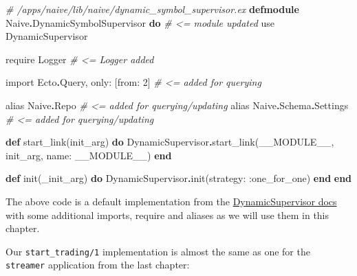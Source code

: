 \documentclass[
]{book}
\newenvironment{Shaded}{\begin{snugshade}}{\end{snugshade}}
\newcommand{\CommentTok}[1]{\textcolor[rgb]{0.56,0.35,0.01}{\textit{#1}}}
\newcommand{\ConstantTok}[1]{\textcolor[rgb]{0.00,0.00,0.00}{#1}}
\newcommand{\DecValTok}[1]{\textcolor[rgb]{0.00,0.00,0.81}{#1}}
\newcommand{\ImportTok}[1]{#1}
\newcommand{\KeywordTok}[1]{\textcolor[rgb]{0.13,0.29,0.53}{\textbf{#1}}}
\newcommand{\NormalTok}[1]{#1}
\newcommand{\OperatorTok}[1]{\textcolor[rgb]{0.81,0.36,0.00}{\textbf{#1}}}
\newcommand{\VariableTok}[1]{\textcolor[rgb]{0.00,0.00,0.00}{#1}}
\begin{document}
\begin{Shaded}
\begin{Highlighting}[]
\CommentTok{\# /apps/naive/lib/naive/dynamic\_symbol\_supervisor.ex}
\KeywordTok{defmodule} \ConstantTok{Naive}\OperatorTok{.}\ConstantTok{DynamicSymbolSupervisor} \KeywordTok{do} \CommentTok{\# \textless{}= module updated}
  \ImportTok{use} \ConstantTok{DynamicSupervisor}

  \ImportTok{require} \ConstantTok{Logger} \CommentTok{\# \textless{}= Logger added}

  \ImportTok{import} \ConstantTok{Ecto}\OperatorTok{.}\ConstantTok{Query}\NormalTok{, }\VariableTok{only:}\NormalTok{ [}\VariableTok{from:} \DecValTok{2}\NormalTok{] }\CommentTok{\# \textless{}= added for querying}

  \ImportTok{alias} \ConstantTok{Naive}\OperatorTok{.}\ConstantTok{Repo}             \CommentTok{\# \textless{}= added for querying/updating}
  \ImportTok{alias} \ConstantTok{Naive}\OperatorTok{.}\ConstantTok{Schema}\OperatorTok{.}\ConstantTok{Settings}  \CommentTok{\# \textless{}= added for querying/updating}

  \KeywordTok{def}\NormalTok{ start\_link(init\_arg) }\KeywordTok{do}
    \ConstantTok{DynamicSupervisor}\OperatorTok{.}\NormalTok{start\_link(}\ConstantTok{\_\_MODULE\_\_}\NormalTok{, init\_arg, }\VariableTok{name:} \ConstantTok{\_\_MODULE\_\_}\NormalTok{)}
  \KeywordTok{end}

  \KeywordTok{def}\NormalTok{ init(\_init\_arg) }\KeywordTok{do}
    \ConstantTok{DynamicSupervisor}\OperatorTok{.}\NormalTok{init(}\VariableTok{strategy:} \VariableTok{:one\_for\_one}\NormalTok{)}
  \KeywordTok{end}
\KeywordTok{end}
\end{Highlighting}
\end{Shaded}

The above code is a default implementation from the \href{https://hexdocs.pm/elixir/master/DynamicSupervisor.html\#module-module-based-supervisors}{DynamicSupervisor docs} with some additional imports, require and aliases as we will use them in this chapter.

Our \texttt{start\_trading/1} implementation is almost the same as one for the \texttt{streamer} application from the last chapter:
\end{document}
